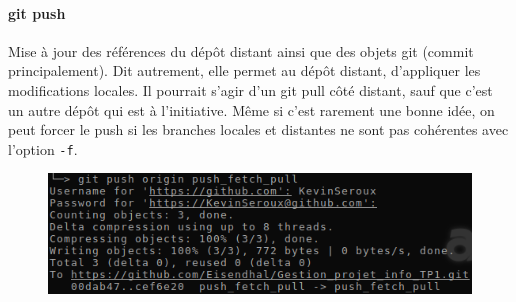 \documentclass[11pt,canadien]{article}
\begin{document}
\paragraph{git push}Mise à jour des références du dépôt distant ainsi que des objets git (commit principalement). Dit autrement, elle permet au dépôt distant, d'appliquer les modifications locales. Il pourrait s'agir d'un git pull côté distant, sauf que c'est un autre dépôt qui est à l'initiative. Même si c'est rarement une bonne idée, on peut forcer le push si les branches locales et distantes ne sont pas cohérentes avec l'option \texttt{-f}.
\begin{figure}[h]
	\centering
	\includegraphics{images/git_push.png}
\end{figure}
\end{document}
